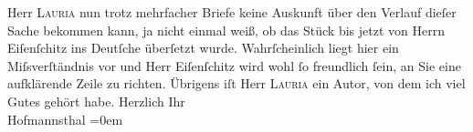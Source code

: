 \begin{ledgroupsized}[t]{13cm}
                    Herr \textsc{Lauria} nun trotz mehrfacher Briefe keine Auskunft über den Verlauf dieſer
                    Sache bekommen kann, ja nicht einmal {\pb}weiß, ob das Stück bis jetzt
                        \introOben{}von Herrn Eiſenſchitz\introOben{} ins Deutſche überſetzt wurde.\pend
           \pstart
           Wahrſcheinlich liegt hier ein Miſsverſtändnis vor und Herr Eiſenſchitz wird wohl ſo freundlich ſein, an Sie
                    eine aufklärende Zeile zu richten. Übrigens iſt Herr \textsc{Lauria} ein {\pb}Autor, von
                    dem ich viel Gutes gehört habe.\pend
           \pstart
           Herzlich Ihr{\\[\baselineskip]}\spacefill\mbox{Hofmannsthal}\pend
           \leftskip=0em{}
         
         \endnumbering{}\end{ledgroupsized}  \newcommand{\dateiname}{L00865}\newcommand{\titel}{Hugo von Hofmannsthal an Arthur Schnitzler, 3. 12. 1898}\newcommand{\editorInnen}{Martin Anton Müller und Gerd-Hermann Susen}
      